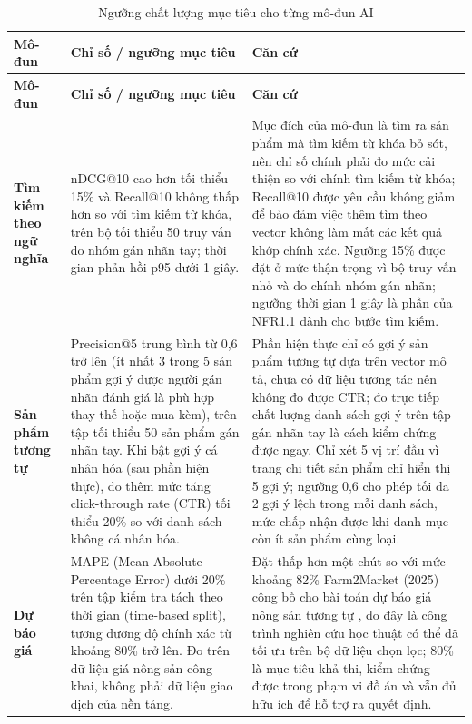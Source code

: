 \begingroup
\tblsetup\tblzebra
\begin{longtable}{L{2.48cm} L{5.98cm} L{6.44cm}}
\caption{Ngưỡng chất lượng mục tiêu cho từng mô-đun AI}
\label{tab:nguongAI} \\
\toprule
{}
\textbf{Mô-đun} & \textbf{Chỉ số / ngưỡng mục tiêu} & \textbf{Căn cứ} \\
\midrule
\endfirsthead
\toprule
{}
\textbf{Mô-đun} & \textbf{Chỉ số / ngưỡng mục tiêu} & \textbf{Căn cứ} \\
\midrule
\endhead
\bottomrule
\endfoot
\textbf{Tìm kiếm theo ngữ nghĩa} &
nDCG@10 cao hơn tối thiểu 15\% và Recall@10 không thấp hơn so với tìm kiếm từ khóa, trên bộ tối thiểu 50 truy vấn do nhóm gán nhãn tay; thời gian phản hồi p95 dưới 1 giây. &
Mục đích của mô-đun là tìm ra sản phẩm mà tìm kiếm từ khóa bỏ sót, nên chỉ số chính phải đo mức cải thiện so với chính tìm kiếm từ khóa; Recall@10 được yêu cầu không giảm để bảo đảm việc thêm tìm theo vector không làm mất các kết quả khớp chính xác. Ngưỡng 15\% được đặt ở mức thận trọng vì bộ truy vấn nhỏ và do chính nhóm gán nhãn; ngưỡng thời gian 1 giây là phần của NFR1.1 dành cho bước tìm kiếm. \\
\textbf{Sản phẩm tương tự} &
Precision@5 trung bình từ 0,6 trở lên (ít nhất 3 trong 5 sản phẩm gợi ý được người gán nhãn đánh giá là phù hợp thay thế hoặc mua kèm), trên tập tối thiểu 50 sản phẩm gán nhãn tay. Khi bật gợi ý cá nhân hóa (sau phần hiện thực), đo thêm mức tăng click-through rate (CTR) tối thiểu 20\% so với danh sách không cá nhân hóa. &
Phần hiện thực chỉ có gợi ý sản phẩm tương tự dựa trên vector mô tả, chưa có dữ liệu tương tác nên không đo được CTR; đo trực tiếp chất lượng danh sách gợi ý trên tập gán nhãn tay là cách kiểm chứng được ngay. Chỉ xét 5 vị trí đầu vì trang chi tiết sản phẩm chỉ hiển thị 5 gợi ý; ngưỡng 0,6 cho phép tối đa 2 gợi ý lệch trong mỗi danh sách, mức chấp nhận được khi danh mục còn ít sản phẩm cùng loại. \\
\textbf{Dự báo giá} &
MAPE (Mean Absolute Percentage Error) dưới 20\% trên tập kiểm tra tách theo thời gian (time-based split), tương đương độ chính xác từ khoảng 80\% trở lên. Đo trên dữ liệu giá nông sản công khai, không phải dữ liệu giao dịch của nền tảng. &
Đặt thấp hơn một chút so với mức khoảng 82\% Farm2Market (2025) công bố cho bài toán dự báo giá nông sản tương tự \parencite{farm2market_2025}, do đây là công trình nghiên cứu học thuật có thể đã tối ưu trên bộ dữ liệu chọn lọc; 80\% là mục tiêu khả thi, kiểm chứng được trong phạm vi đồ án và vẫn đủ hữu ích để hỗ trợ ra quyết định. \\
\end{longtable}
\endgroup

